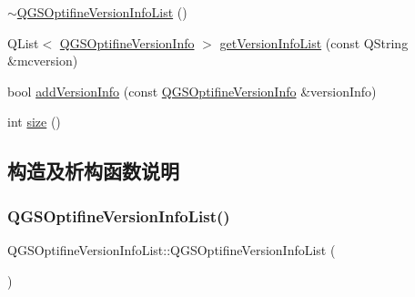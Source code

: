 \begin{DoxyCompactItemize}
\item 
\mbox{\hyperlink{class_q_g_s_optifine_version_info_list_a4c7bfa17d4d167a87092e2407ec0bab2}{$\sim$\+Q\+G\+S\+Optifine\+Version\+Info\+List}} ()
\item 
Q\+List$<$ \mbox{\hyperlink{class_q_g_s_optifine_version_info}{Q\+G\+S\+Optifine\+Version\+Info}} $>$ \mbox{\hyperlink{class_q_g_s_optifine_version_info_list_a82419464337b6e5d572ef6cf1738dbc7}{get\+Version\+Info\+List}} (const Q\+String \&mcversion)
\item 
bool \mbox{\hyperlink{class_q_g_s_optifine_version_info_list_a7de4bda7eb10ee7672b0dd95b04db027}{add\+Version\+Info}} (const \mbox{\hyperlink{class_q_g_s_optifine_version_info}{Q\+G\+S\+Optifine\+Version\+Info}} \&version\+Info)
\item 
int \mbox{\hyperlink{class_q_g_s_optifine_version_info_list_a0ff7a163fac562dcf2b88cceb18a4ad0}{size}} ()
\end{DoxyCompactItemize}


\subsection{构造及析构函数说明}
\mbox{\label{class_q_g_s_optifine_version_info_list_a24b409e8442f7584853e386b1aa0560a}} 
\subsubsection{\texorpdfstring{Q\+G\+S\+Optifine\+Version\+Info\+List()}{QGSOptifineVersionInfoList()}\hspace{0.1cm}{\footnotesize\ttfamily [1/3]}}
{\footnotesize\ttfamily Q\+G\+S\+Optifine\+Version\+Info\+List\+::\+Q\+G\+S\+Optifine\+Version\+Info\+List (\begin{DoxyParamCaption}{ }\end{DoxyParamCaption})}

\mbox{\label{class_q_g_s_optifine_version_info_list_a315041bad31aae8eed980d64cf85f6ce}} 
